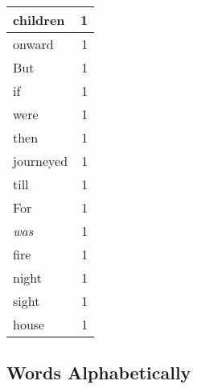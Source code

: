 \begin{center}
\begin{longtable}{l|r}
children & 1 \\ \hline
onward & 1 \\ \hline
But & 1 \\ \hline
if & 1 \\ \hline
were & 1 \\ \hline
then & 1 \\ \hline
journeyed & 1 \\ \hline
till & 1 \\ \hline
For & 1 \\ \hline
\emph{was} & 1 \\ \hline
fire & 1 \\ \hline
night & 1 \\ \hline
sight & 1 \\ \hline
house & 1 \\ \hline
\end{longtable}
\end{center}



\normalsize



\subsection{Words Alphabetically}

